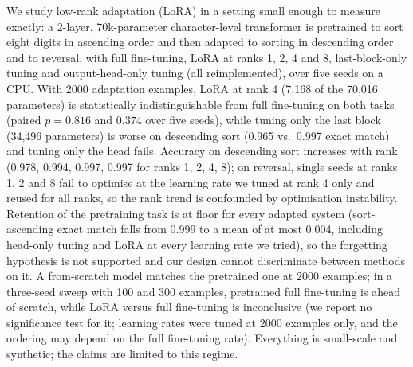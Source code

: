 We study low-rank adaptation (LoRA) in a setting small enough to measure exactly: a 2-layer, 70k-parameter character-level transformer is pretrained to sort eight digits in ascending order and then adapted to sorting in descending order and to reversal, with full fine-tuning, LoRA at ranks 1, 2, 4 and 8, last-block-only tuning and output-head-only tuning (all reimplemented), over five seeds on a CPU. With 2000 adaptation examples, LoRA at rank 4 (7,168 of the 70,016 parameters) is statistically indistinguishable from full fine-tuning on both tasks (paired $p=0.816$ and $0.374$ over five seeds), while tuning only the last block (34,496 parameters) is worse on descending sort (0.965 vs.\ 0.997 exact match) and tuning only the head fails. Accuracy on descending sort increases with rank (0.978, 0.994, 0.997, 0.997 for ranks 1, 2, 4, 8); on reversal, single seeds at ranks 1, 2 and 8 fail to optimise at the learning rate we tuned at rank 4 only and reused for all ranks, so the rank trend is confounded by optimisation instability. Retention of the pretraining task is at floor for every adapted system (sort-ascending exact match falls from 0.999 to a mean of at most 0.004, including head-only tuning and LoRA at every learning rate we tried), so the forgetting hypothesis is not supported and our design cannot discriminate between methods on it. A from-scratch model matches the pretrained one at 2000 examples; in a three-seed sweep with 100 and 300 examples, pretrained full fine-tuning is ahead of scratch, while LoRA versus full fine-tuning is inconclusive (we report no significance test for it; learning rates were tuned at 2000 examples only, and the ordering may depend on the full fine-tuning rate). Everything is small-scale and synthetic; the claims are limited to this regime.
